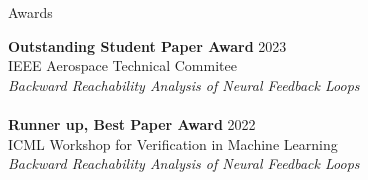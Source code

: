 \begin{rSection}{Awards}

    \textbf{Outstanding Student Paper Award} \hfill 2023 \\
    IEEE Aerospace Technical Commitee \\ \textit{Backward Reachability Analysis of Neural Feedback Loops} \\ \\
    \textbf{Runner up, Best Paper Award} \hfill 2022 \\
    ICML Workshop for Verification in Machine Learning \\ \textit{Backward Reachability Analysis of Neural Feedback Loops} \\ \\

\end{rSection}